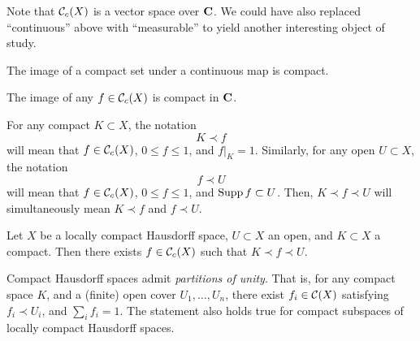 Note that $\mathcal{C}_c(X)$ is a vector space over $\mathbf{C}$. We could have also replaced ``continuous'' above with ``measurable'' to yield another interesting object of study.

\begin{theorem}
  The image of a compact set under a continuous map is compact.
\end{theorem}

\begin{corollary}
  The image of any $f \in \mathcal{C}_c(X)$ is compact in $\mathbf{C}$.
\end{corollary}

\begin{definition}
  For any compact $K \subset X$, the notation
  \[
  K \prec f
  \]
  will mean that $f \in \mathcal{C}_c(X)$, $0 \leq f \leq 1$, and $f|_K = 1$. Similarly, for any open $U \subset X$, the notation
  \[
  f \prec U
  \]
  will mean that $f \in \mathcal{C}_c(X)$, $0 \leq f \leq 1$, and $\operatorname{Supp} f \subset U$. Then, $K \prec f \prec U$ will simultaneously mean $K \prec f$ and $f \prec U$.
\end{definition}

\begin{proposition}
  Let $X$ be a locally compact Hausdorff space, $U \subset X$ an open, and $K \subset X$ a compact. Then there exists $f \in \mathcal{C}_c(X)$ such that $K \prec f \prec U$.
\end{proposition}

\begin{theorem}
  Compact Hausdorff spaces admit \emph{partitions of unity}. That is, for any compact space $K$, and a (finite) open cover $U_1, \dots, U_n$, there exist $f_i \in \mathcal{C}(X)$ satisfying $f_i \prec U_i$, and $\sum_i f_i = 1$. The statement also holds true for compact subspaces of locally compact Hausdorff spaces.
\end{theorem}

